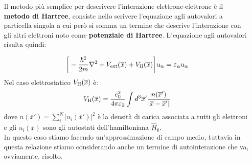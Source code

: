 Il metodo più semplice per descrivere l'interazione elettrone-elettrone è il \textbf{metodo di Hartree}, consiste nello scrivere l'equazione agli autovalori a particella singola a cui però si somma un termine che descrive l'interazione con gli altri elettroni noto come \textbf{potenziale di Hartree}. L'equazione agli autovalori risulta quindi:

\begin{equation*}
    \bigg[-\frac{\hbar^2}{2m}\nabla^2 + V_{\text{ext}}(\overline x) + V_{\text H}(\overline x)\bigg]u_\alpha=\varepsilon_\alpha u_\alpha
\end{equation*}
Nel caso elettrostatico $V_{\text H}(\overline x)$ è:
\begin{equation*}
    V_{\text H}(\overline x) = \frac{e_0^2}{4\pi\varepsilon_0}\int d^3\overline{x}' \frac{n(\overline{x}')}{|\overline x - \overline{x}'|}
\end{equation*}
dove $n(\overline{x}')=\sum_i^N|u_i(\overline{x}')|^2$ è la densità di carica associata a tutti gli elettroni e gli $u_i(\overline x)$ sono gli autostati dell'hamiltoniana $\hat H_0$. \\

In questo caso stiamo facendo un'approssimazione di campo medio, tuttavia in questa relazione stiamo considerando anche un termine di autointerazione che va, ovviamente, risolto. \\


